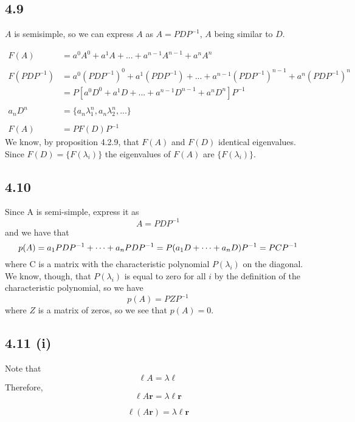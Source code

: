 \documentclass[letterpaper,12pt]{article}
\theoremstyle{definition}
\begin{document}
\subsection*{4.9}
$A$ is semisimple, so we can express $A$ as $A = PDP^{-1}$, $A$ being similar to $D$. 

\begin{align*}
F(A) &= a^{0}A^{0} + a^{1}A + ... + a^{n-1}A^{n-1} + a^{n}A^{n} \\ \\
F(PDP^{-1}) &= a^{0}(PDP^{-1})^{0} + a^{1}(PDP^{-1}) + ... + a^{n-1}(PDP^{-1})^{n-1} + a^{n}(PDP^{-1})^{n}\\
&= P[a^{0}D^{0} + a^{1}D + ... + a^{n-1}D^{n-1} + a^{n}D^{n}]P^{-1}\\ \\
a_{n}D^{n} &= \{a_{n}\lambda_{1}^{n}, a_{n}\lambda_{2}^{n}, ...\} \\ \\
F(A) &= PF(D)P^{-1}
\end{align*}
We know, by proposition 4.2.9, that $F(A)$ and $F(D)$ identical eigenvalues. Since $F(D) = \{F(\lambda_{i})\}$ the eigenvalues of $F(A)$ are $\{F(\lambda_{i})\}$.

\subsection*{4.10}

Since A is semi-simple, express it as
\[A = PDP^{-1}\]
and we have that
\[
p(A) = a_1PDP^{-1} + \dots + a_n PDP^{-1}\\
= P(a_1 D +\dots+ a_n D) P^{-1}\\
= PCP^{-1} \]
where C is a matrix with the characteristic polynomial $P(\lambda_i)$ on the diagonal. We know, though, that $P(\lambda_i)$ is equal to zero for all $i$ by the definition of the characteristic polynomial, so we have 
\[p(A) = PZP^{-1}\]
where $Z$ is a matrix of zeros, so we see that $p(A) = 0$.



\subsection*{4.11 (i)}

Note that \\
\[  \mathbf{\ell} A = \lambda \mathbf{\ell} \]
Therefore,
\[ \mathbf{\ell}A \mathbf{r} = \lambda \mathbf{\ell} \mathbf{r} \]

\[ \mathbf{\ell}(A \mathbf{r}) = \lambda \mathbf{\ell}\mathbf{r} \]
\end{document}
